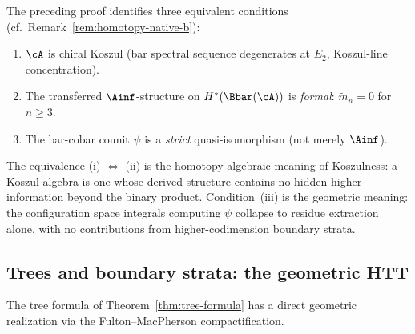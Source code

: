 \begin{remark}
\label{rem:koszulness-formality-htt}
The preceding proof identifies three equivalent conditions
(cf.\ Remark~\ref{rem:homotopy-native-b}):
\begin{enumerate}[label=(\roman*)]
\item $\cA$ is chiral Koszul (bar spectral sequence degenerates at
$E_2$, Koszul-line concentration).
\item The transferred $\Ainf$-structure on $H^*(\Bbar(\cA))$ is
\emph{formal}: $\tilde{m}_n = 0$ for $n \geq 3$.
\item The bar-cobar counit $\psi$ is a \emph{strict}
quasi-isomorphism (not merely $\Ainf$).
\end{enumerate}
The equivalence (i) $\Leftrightarrow$ (ii) is the homotopy-algebraic
meaning of Koszulness: a Koszul algebra is one whose derived
structure contains no hidden higher information beyond the binary
product. Condition~(iii) is the geometric meaning: the
configuration space integrals computing $\psi$ collapse to residue
extraction alone, with no contributions from higher-codimension
boundary strata.
\end{remark}

\subsection{Trees and boundary strata: the geometric HTT}

The tree formula of Theorem~\ref{thm:tree-formula} has a direct
geometric realization via the Fulton--MacPherson compactification.

